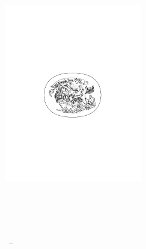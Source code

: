 \begin{titlepage}
    \begin{addmargin}[-1cm]{-3cm}
    \begin{center}
        \large

        \hfill

        \vfill

        \begingroup
            \color{CTtitle}\spacedallcaps{\myTitle} \\ \bigskip
        \endgroup

        \spacedlowsmallcaps{\myName}

        \vfill

        \includegraphics[width=6cm]{gfx/TFZsuperellipse_bw} \\ \medskip

        \myDegree \\
        \myDepartment \\
        \myUni \\ \bigskip

        \myTime\ -- \myVersion

        \vfill

    \end{center}
  \end{addmargin}
\end{titlepage}
